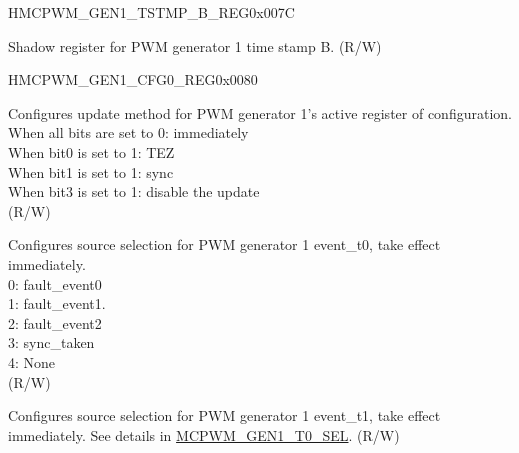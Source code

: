 \begin{register}{H}{MCPWM\_GEN1\_TSTMP\_B\_REG}{0x007C}\label{regdesc:MCPWMGEN1TSTMPBREG}
%
%
\regnewline%
\begin{regdesc}\begin{reglist}
\label{fielddesc:MCPWMGEN1B}\item [MCPWM\_GEN1\_B] Shadow register for PWM generator 1 time stamp B. (R/W)
\end{reglist}\end{regdesc}
\end{register}


\begin{register}{H}{MCPWM\_GEN1\_CFG0\_REG}{0x0080}\label{regdesc:MCPWMGEN1CFG0REG}
%
%
%
%
\regnewline%
\begin{regdesc}\begin{reglist}
\label{fielddesc:MCPWMGEN1CFGUPMETHOD}\item [MCPWM\_GEN1\_CFG\_UPMETHOD] Configures update method for PWM generator 1's active register of configuration. 
\\When all bits are set to 0: immediately 
\\When bit0 is set to 1: TEZ 
\\When bit1 is set to 1: sync 
\\When bit3 is set to 1: disable the update 
\\(R/W)
\label{fielddesc:MCPWMGEN1T0SEL}\item [MCPWM\_GEN1\_T0\_SEL] Configures source selection for PWM generator 1 event\_t0, take effect immediately. \\0: fault\_event0 \\1: fault\_event1. \\2: fault\_event2 \\3: sync\_taken \\4: None \\(R/W)
\label{fielddesc:MCPWMGEN1T1SEL}\item [MCPWM\_GEN1\_T1\_SEL] Configures source selection for PWM generator 1 event\_t1, take effect immediately. See details in \hyperref[fielddesc:MCPWMGEN1T0SEL]{MCPWM\_GEN1\_T0\_SEL}. (R/W)
\end{reglist}\end{regdesc}
\end{register}



